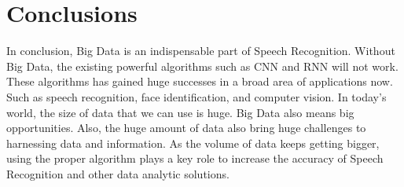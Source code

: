 \documentclass[sigconf]{acmart}
\begin{document}
\section{Conclusions}

In conclusion, Big Data is an indispensable part of Speech Recognition. Without Big Data, the existing powerful algorithms such as CNN and RNN will not work. These algorithms has gained huge successes in a broad area of applications now. Such as speech recognition, face identification, and computer vision. In today's world, the size of data that we can use is huge. Big Data also means big opportunities. Also, the huge amount of data also bring huge challenges to harnessing data and information. As the volume of data keeps getting bigger, using the proper algorithm plays a key role to increase the accuracy of Speech Recognition and other data analytic solutions.



 
\end{document}
